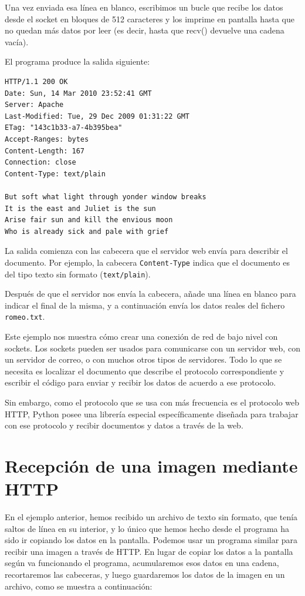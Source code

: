 Una vez enviada esa línea en blanco, escribimos un bucle que recibe los datos
desde el socket en bloques de 512 caracteres y los imprime en pantalla
hasta que no quedan más datos por leer (es decir, hasta que recv() devuelve
una cadena vacía).

El programa produce la salida siguiente:

\beforeverb
\begin{verbatim}
HTTP/1.1 200 OK
Date: Sun, 14 Mar 2010 23:52:41 GMT
Server: Apache
Last-Modified: Tue, 29 Dec 2009 01:31:22 GMT
ETag: "143c1b33-a7-4b395bea"
Accept-Ranges: bytes
Content-Length: 167
Connection: close
Content-Type: text/plain

But soft what light through yonder window breaks
It is the east and Juliet is the sun
Arise fair sun and kill the envious moon
Who is already sick and pale with grief
\end{verbatim}
\afterverb
%
La salida comienza con las cabecera que el servidor web envía
para describir el documento.
Por ejemplo, la cabecera {\tt Content-Type} indica que
el documento es del tipo texto sin formato ({\tt text/plain}).

Después de que el servidor nos envía la cabecera, añade una línea en blanco
para indicar el final de la misma, y a continuación envía los datos
reales del fichero {\tt romeo.txt}.

Este ejemplo nos muestra cómo crear una conexión de red de bajo nivel
con sockets. Los sockets pueden ser usados para comunicarse con un servidor
web, con un servidor de correo, o con muchos otros tipos de servidores.
Todo lo que se necesita es localizar el documento que describe
el protocolo correspondiente y escribir el código para enviar y recibir los datos
de acuerdo a ese protocolo.

Sin embargo, como el protocolo que se usa con más frecuencia es
el protocolo web HTTP, Python posee una librería
especial específicamente diseñada para trabajar con ese protocolo
y recibir documentos y datos a través de la web.

\section{Recepción de una imagen mediante HTTP}

En el ejemplo anterior, hemos recibido un archivo de texto sin formato,
que tenía saltos de línea en su interior, y lo único que hemos hecho
desde el programa ha sido ir copiando los datos en la pantalla. Podemos usar un programa
similar para recibir una imagen a través de HTTP. En lugar
de copiar los datos a la pantalla según va funcionando el programa,
acumularemos esos datos en una cadena, recortaremos las cabeceras,
y luego guardaremos los datos de la imagen en un archivo, como se muestra a continuación:

